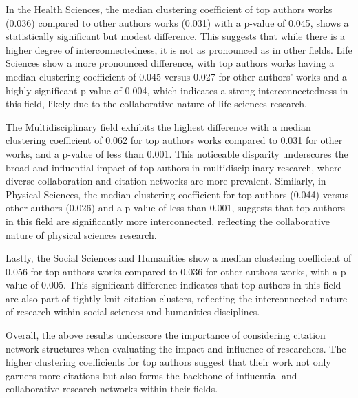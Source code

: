 In the Health Sciences, the median clustering coefficient of top authors works
(0.036) compared to other authors works (0.031) with a p-value of 0.045, shows
a statistically significant but modest difference. This suggests that while
there is a higher degree of interconnectedness, it is not as pronounced as in
other fields. Life Sciences show a more pronounced difference, with top authors
works having a median clustering coefficient of 0.045 versus 0.027 for other
authors' works and a highly significant p-value of 0.004, which indicates a
strong interconnectedness in this field, likely due to the collaborative nature
of life sciences research.

The Multidisciplinary field exhibits the highest difference with a median
clustering coefficient of 0.062 for top authors works compared to 0.031 for
other works, and a p-value of less than 0.001. This noticeable disparity
underscores the broad and influential impact of top authors in
multidisciplinary research, where diverse collaboration and citation networks
are more prevalent. Similarly, in Physical Sciences, the median clustering
coefficient for top authors (0.044) versus other authors (0.026) and a p-value
of less than 0.001, suggests that top authors in this field are significantly
more interconnected, reflecting the collaborative nature of physical sciences
research.

Lastly, the Social Sciences and Humanities show a median clustering coefficient
of 0.056 for top authors works compared to 0.036 for other authors works, with
a p-value of 0.005. This significant difference indicates that top authors in
this field are also part of tightly-knit citation clusters, reflecting the
interconnected nature of research within social sciences and humanities
disciplines.

Overall, the above results underscore the importance of considering citation
network structures when evaluating the impact and influence of researchers. The
higher clustering coefficients for top authors suggest that their work not only
garners more citations but also forms the backbone of influential and
collaborative research networks within their fields.

